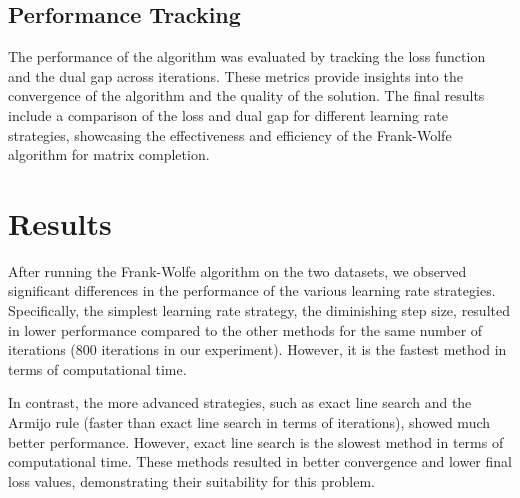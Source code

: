\documentclass[a4paper, 11pt, reqno]{article} %
\begin{document}
\begin{multicols}{2}
\subsection{Performance Tracking}
The performance of the algorithm was evaluated by tracking the loss function and the dual gap across iterations. These metrics provide insights into the convergence of the algorithm and the quality of the solution. The final results include a comparison of the loss and dual gap for different learning rate strategies, showcasing the effectiveness and efficiency of the Frank-Wolfe algorithm for matrix completion.


\section{Results}

After running the Frank-Wolfe algorithm on the two datasets, we observed significant differences in the performance of the various learning rate strategies. Specifically, the simplest learning rate strategy, the diminishing step size, resulted in lower performance compared to the other methods for the same number of iterations (800 iterations in our experiment). However, it is the fastest method in terms of computational time. 

In contrast, the more advanced strategies, such as exact line search and the Armijo rule (faster than exact line search in terms of iterations), showed much better performance. However, exact line search is the slowest method in terms of computational time. These methods resulted in better convergence and lower final loss values, demonstrating their suitability for this problem.




\end{multicols}
\end{document}
